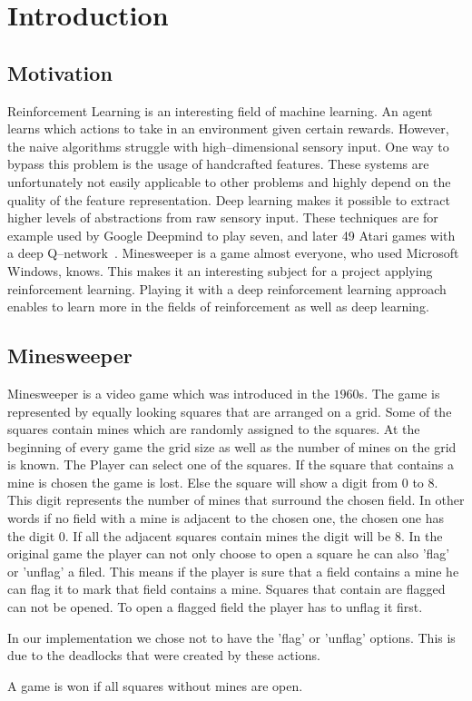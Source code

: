 \chapter{Introduction}

\section{Motivation}
Reinforcement Learning is an interesting field of machine learning. An agent learns which
actions to take in an environment given certain rewards. However, the naive algorithms
struggle with high--dimensional sensory input. One way to bypass this problem is the
usage of handcrafted features. These systems are unfortunately not easily applicable
to other problems and highly depend on the quality of the feature representation. Deep
learning makes it possible to extract higher levels of abstractions from raw sensory input.
These techniques are for example used by Google Deepmind to play seven, and later 49 Atari games with a deep Q--network~\cite{mnih2013playing, mnih2015human}.
Minesweeper is a game almost everyone, who used Microsoft Windows, knows. 
This makes it an interesting subject for a project applying reinforcement learning. Playing
it with a deep reinforcement learning approach enables to learn more in the fields of reinforcement as well as deep learning.

\section{Minesweeper}
Minesweeper is a video game which was introduced in the $1960$s. 
The game is represented by equally looking squares that are arranged on a grid. 
Some of the squares contain mines which are randomly assigned to the squares. 
At the beginning of every game the grid size as well as the number of mines on the grid is known.
The Player can select one of the squares. 
If the square that contains a mine is chosen the game is lost.
Else the square will show a digit from $0$ to $8$.
This digit represents the number of mines that surround the chosen field.
In other words if no field with a mine is adjacent to the chosen one, the chosen one has the digit $0$. 
If all the adjacent squares contain mines the digit will be $8$.
In the original game the player can not only choose to open a square he can also 'flag' or 'unflag' a filed.
This means if the player is sure that a field contains a mine he can flag it to mark that field contains a mine. 
Squares that contain are flagged can not be opened. 
To open a flagged field the player has to unflag it first.

In our implementation we chose not to have the 'flag' or 'unflag' options. This is due to the deadlocks that were created by these actions.

A game is won if all squares without mines are open.